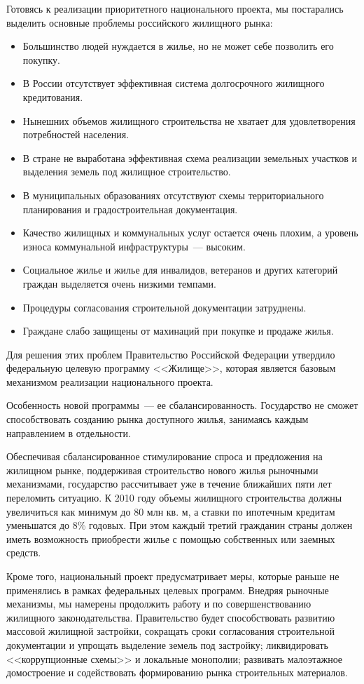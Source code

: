 \documentclass[article, 12pt, russian, oneside]{ncc}
\begin{document}
Готовясь к реализации приоритетного национального проекта, мы постарались выделить основные проблемы российского жилищного рынка:

\begin{itemize}
\item Большинство людей нуждается в жилье, но не может себе позволить его покупку.
\item В России отсутствует эффективная система долгосрочного жилищного кредитования.
\item Нынешних объемов жилищного строительства не хватает для удовлетворения потребностей населения.
\item В стране не выработана эффективная схема реализации земельных участков и выделения земель под жилищное строительство.
\item В муниципальных образованиях отсутствуют схемы территориального планирования и градостроительная документация.
\item Качество жилищных и коммунальных услуг остается очень плохим, а уровень износа коммунальной инфраструктуры~--- высоким.
\item Социальное жилье и жилье для инвалидов, ветеранов и других категорий граждан выделяется очень низкими темпами.
\item Процедуры согласования строительной документации затруднены.
\item Граждане слабо защищены от махинаций при покупке и продаже жилья.
\end{itemize}

Для решения этих проблем Правительство Российской Федерации утвердило федеральную целевую программу <<Жилище>>, которая является базовым механизмом реализации национального проекта.

Особенность новой программы~--- ее сбалансированность. Государство не сможет способствовать созданию рынка доступного жилья, занимаясь каждым направлением в отдельности.

Обеспечивая сбалансированное стимулирование спроса и предложения на жилищном рынке, поддерживая строительство нового жилья рыночными механизмами, государство рассчитывает уже в течение ближайших пяти лет переломить ситуацию. К 2010 году объемы жилищного строительства должны увеличиться как минимум до 80 млн кв. м, а ставки по ипотечным кредитам уменьшатся до 8\% годовых. При этом каждый третий гражданин страны должен иметь возможность приобрести жилье с помощью собственных или заемных средств.

Кроме того, национальный проект предусматривает меры, которые раньше не применялись в рамках федеральных целевых программ. Внедряя рыночные механизмы, мы намерены продолжить работу и по совершенствованию жилищного законодательства. Правительство будет способствовать развитию массовой жилищной застройки, сокращать сроки согласования строительной документации и упрощать выделение земель под застройку; ликвидировать <<коррупционные схемы>> и локальные монополии; развивать малоэтажное домостроение и содействовать формированию рынка строительных материалов.
\end{document}

